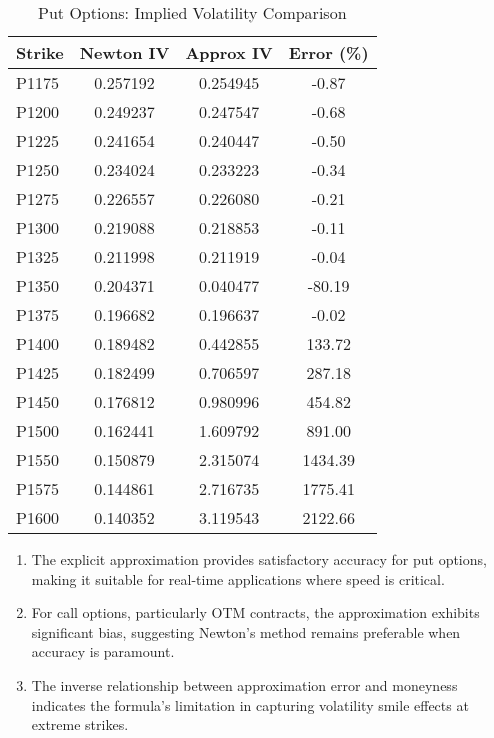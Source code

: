 \documentclass{article}
\begin{document}
\begin{table}[htbp]
    \centering
    \caption{Put Options: Implied Volatility Comparison}
    \label{tab:put_iv}
    \begin{tabular}{l S[table-format=1.6] S[table-format=1.6] S[table-format=-1.6]}
        \toprule
        Strike & {Newton IV} & {Approx IV} & {Error (\%)} \\
        \midrule
        P1175  & 0.257192    & 0.254945    & -0.87        \\
        P1200  & 0.249237    & 0.247547    & -0.68        \\
        P1225  & 0.241654    & 0.240447    & -0.50        \\
        P1250  & 0.234024    & 0.233223    & -0.34        \\
        P1275  & 0.226557    & 0.226080    & -0.21        \\
        P1300  & 0.219088    & 0.218853    & -0.11        \\
        P1325  & 0.211998    & 0.211919    & -0.04        \\
        P1350  & 0.204371    & 0.040477    & -80.19       \\
        P1375  & 0.196682    & 0.196637    & -0.02        \\
        P1400  & 0.189482    & 0.442855    & 133.72       \\
        P1425  & 0.182499    & 0.706597    & 287.18       \\
        P1450  & 0.176812    & 0.980996    & 454.82       \\
        P1500  & 0.162441    & 1.609792    & 891.00       \\
        P1550  & 0.150879    & 2.315074    & 1434.39      \\
        P1575  & 0.144861    & 2.716735    & 1775.41      \\
        P1600  & 0.140352    & 3.119543    & 2122.66      \\
        \bottomrule
    \end{tabular}
\end{table}

\begin{enumerate}
    \item The explicit approximation provides satisfactory accuracy for put options, making it suitable for real-time applications where speed is critical.

    \item For call options, particularly OTM contracts, the approximation exhibits significant bias, suggesting Newton's method remains preferable when accuracy is paramount.

    \item The inverse relationship between approximation error and moneyness indicates the formula's limitation in capturing volatility smile effects at extreme strikes.
\end{enumerate}
\end{document}

